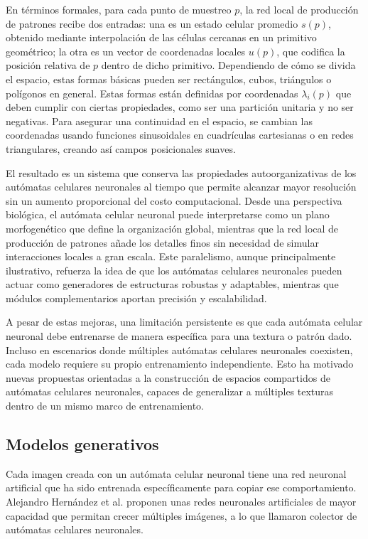 En términos formales, para cada punto de muestreo $p$, la red local de producción de patrones recibe dos entradas: una es un estado celular promedio $s(p)$, obtenido mediante interpolación de las células cercanas en un primitivo geométrico; la otra es un vector de coordenadas locales $u(p)$, que codifica la posición relativa de $p$ dentro de dicho primitivo. Dependiendo de cómo se divida el espacio, estas formas básicas pueden ser rectángulos, cubos, triángulos o polígonos en general. Estas formas están definidas por coordenadas $\lambda_i(p)$ que deben cumplir con ciertas propiedades, como ser una partición unitaria y no ser negativas. Para asegurar una continuidad en el espacio, se cambian las coordenadas usando funciones sinusoidales en cuadrículas cartesianas o en redes triangulares, creando así campos posicionales suaves.

El resultado es un sistema que conserva las propiedades autoorganizativas de los autómatas celulares neuronales al tiempo que permite alcanzar mayor resolución sin un aumento proporcional del costo computacional. Desde una perspectiva biológica, el autómata celular neuronal puede interpretarse como un plano morfogenético que define la organización global, mientras que la red local de producción de patrones añade los detalles finos sin necesidad de simular interacciones locales a gran escala. Este paralelismo, aunque principalmente ilustrativo, refuerza la idea de que los autómatas celulares neuronales pueden actuar como generadores de estructuras robustas y adaptables, mientras que módulos complementarios aportan precisión y escalabilidad.

A pesar de estas mejoras, una limitación persistente es que cada autómata celular neuronal debe entrenarse de manera específica para una textura o patrón dado. Incluso en escenarios donde múltiples autómatas celulares neuronales coexisten, cada modelo requiere su propio entrenamiento independiente. Esto ha motivado nuevas propuestas orientadas a la construcción de espacios compartidos de autómatas celulares neuronales, capaces de generalizar a múltiples texturas dentro de un mismo marco de entrenamiento.

\subsection{Modelos generativos}

Cada imagen creada con un autómata celular neuronal tiene una red neuronal artificial que ha sido entrenada específicamente para copiar ese comportamiento. Alejandro Hernández et al. \cite{hernandez2021_ncam} proponen unas redes neuronales artificiales de mayor capacidad que permitan crecer múltiples imágenes, a lo que llamaron colector de autómatas celulares neuronales.

